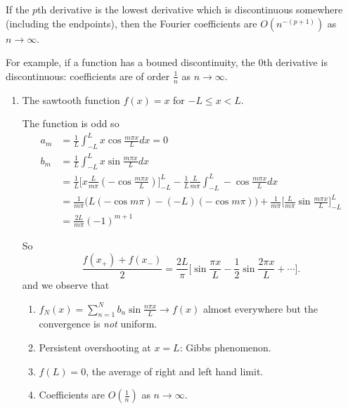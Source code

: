 \documentclass[a4paper]{article}
\begin{document}
If the $p$th derivative is the lowest derivative which is discontinuous somewhere (including the endpoints), then the Fourier coefficients are $O(n^{-(p+1)})$ as $n \to \infty$.

For example, if a function has a bouned discontinuity, the $0$th derivative is discontinuous: coefficients are of order $\frac{1}{n}$ as $n \to \infty$.

\begin{eg}\leavevmode
  \begin{enumerate}
  \item The sawtooth function $f(x) = x$ for $-L \leq x < L$.
    \begin{center}
    \end{center}
    The function is odd so
\begin{align*}
  a_m &= \frac{1}{L}\int_{-L}^L x \cos\frac{m\pi x}{L} dx = 0 \\ 
  b_m  &= \frac{1}{L}\int_{-L}^L x \sin\frac{m\pi x}{L} dx \\
      &= \frac{1}{L}\Big[x \frac{L}{m\pi}(-\cos\frac{m\pi x}{L})\Big]_{-L}^L - \frac{1}{L}\frac{L}{m\pi} \int_{-L}^L -\cos\frac{m\pi x}{L} dx \\
      &= \frac{1}{m\pi}\Big( L(-\cos m\pi) - (-L)(-\cos m\pi) \Big) + \frac{1}{m\pi} \Big[ \frac{L}{m\pi} \sin\frac{m\pi x}{L} \Big]_{-L}^L \\
  &= \frac{2L}{m\pi}(-1)^{m+1}
\end{align*}

So
\[
  \frac{f(x_+)+f(x_-)}{2} = \frac{2L}{\pi}\Big[\sin\frac{\pi x}{L} - \frac{1}{2}\sin\frac{2\pi x}{L} + \cdots \Big].
\]
and we observe that
\begin{enumerate}
\item $f_N(x) = \sum_{n=1}^N b_n\sin\frac{n\pi x}{L} \to f(x)$ almost everywhere but the convergence is \emph{not} uniform.
\item Persistent overshooting at $x=L$: Gibbs phenomenon.
\item $f(L) = 0$, the average of right and left hand limit.
\item Coefficients are $O(\frac{1}{n})$ as $n\to \infty$.
\end{enumerate}


\end{enumerate}
\end{eg}
\end{document}
